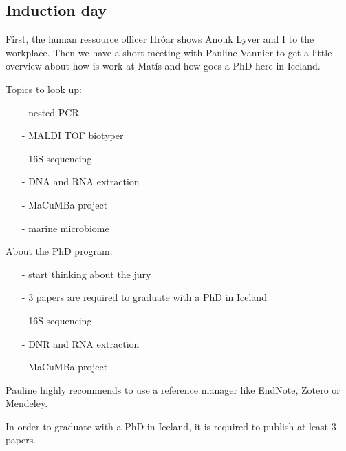 \subsection{Induction day}
\label{task:20170109_cj0}

First, the human ressource officer Hróar shows Anouk Lyver and I to the workplace. Then we have a short meeting with Pauline Vannier to get a little overview about how is work at Matís and how goes a PhD here in Iceland.

Topics to look up:
\begin{itemize}
    \item[-] nested PCR
    \item[-] MALDI TOF biotyper
    \item[-] 16S sequencing
    \item[-] DNA and RNA extraction
    \item[-] MaCuMBa project
    \item[-] marine microbiome \cite{stalmarine}
\end{itemize}

About the PhD program:
\begin{itemize}
    \item[-] start thinking about the jury
    \item[-] 3 papers are required to graduate with a PhD in Iceland
    \item[-] 16S sequencing
    \item[-] DNR and RNA extraction
    \item[-] MaCuMBa project
\end{itemize}

Pauline highly recommends to use a reference manager like EndNote, Zotero or Mendeley. 

In order to graduate with a PhD in Iceland, it is required to publish at least 3 papers.
